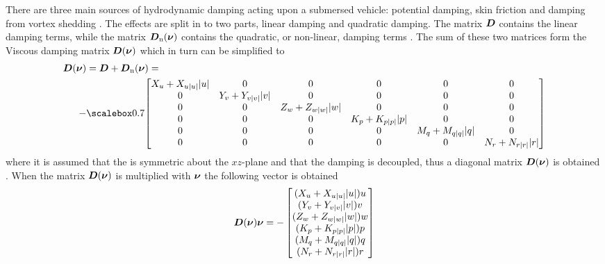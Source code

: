 There are three main sources of hydrodynamic damping acting upon a submersed vehicle: potential damping, skin friction and damping from vortex shedding \citep[p. 122]{fossen2011}. The effects are split in to two parts, linear damping and quadratic damping.
The matrix $\boldsymbol{D}$ contains the linear damping terms, while the matrix $\boldsymbol{D}_{\text{n}}(\boldsymbol{\nu})$ contains the quadratic, or non-linear, damping terms \citep{fossen2011}. The sum of these two matrices form the Viscous damping matrix $\boldsymbol{D}(\boldsymbol{\nu})$ which in turn can be simplified to
\begin{align}
\begin{split}
    \damping(\nuVector) &= \damping + \damping_{\text{n}}(\nuVector) = \\
    -& \scalemath{0.7}{\begin{bmatrix}
        \Xu+\Xuabsu\abs{u} & 0 & 0 & 0 & 0 & 0 \\
        0 & \Yv+\Yvabsv\abs{v} & 0 & 0 & 0 & 0 \\
        0 & 0 & \Zw+\Zwabsw\abs{w} & 0 & 0 & 0 \\
        0 & 0 & 0 & \Kp+\Kpabsp\abs{p} & 0 & 0 \\
        0 & 0 & 0 & 0 & \Mq+\Mqabsq\abs{q} & 0 \\
        0 & 0 & 0 & 0 & 0 & \Nr+\Nrabsr\abs{r} \\
    \end{bmatrix}}
    \end{split}
\end{align}
where it is assumed that the \abbrROV is symmetric about the $xz$-plane and that the damping is decoupled, thus a diagonal matrix $\boldsymbol{D}(\boldsymbol{\nu})$ is obtained \citep[p. 129]{fossen2011}. When the matrix $\boldsymbol{D}(\boldsymbol{\nu})$ is multiplied with $\boldsymbol{\nu}$ the following vector is obtained 
\begin{equation}
    \boldsymbol{D}(\boldsymbol{\nu}) \boldsymbol{\nu} =
     -\begin{bmatrix}
    (X_{u} + X_{u|u|} |u|) u\\
    (Y_{v} + Y_{v|v|} |v|) v\\
    (Z_{w} + Z_{w|w|} |w|) w\\
    (K_{p} + K_{p|p|} |p|) p\\
    (M_{q} + M_{q|q|} |q|) q\\
    (N_{r} + N_{r|r|} |r|) r\\
    \end{bmatrix}    
\end{equation}

